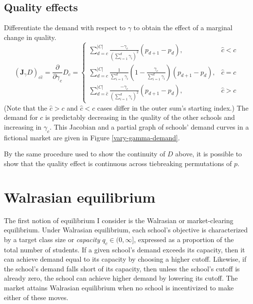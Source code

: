 \documentclass[12pt]{article}
\numberwithin{equation}{subsection}
\theoremstyle{definition}
\begin{document}
\subsection{Quality effects} \label{unconstrainedqualityeffects}
Differentiate the demand with respect to $\gamma$ to obtain the effect of a marginal change in quality.
\begin{equation} \label{jac-gamma-demand-uncons}
\left(\mathbf{J}_\gamma D \right)_{c\hat c} =
\frac{\partial}{\partial\gamma_{\hat c}} D_c = \begin{cases}
\sum_{d=c}^{|C|} \frac{-\gamma_c}{\left(\sum_{i=1}^{d} \gamma_i \right)^2} \left(p_{d+1} - p_d \right), & \hat c < c \\
\sum_{d=c}^{|C|} \frac{1}{\sum_{i=1}^{d} \gamma_i}
    \left( 1 - \frac{\gamma_c}{\sum_{i=1}^{d}\gamma_i }\right)
    \left(p_{d+1} - p_d \right), & \hat c = c\\
\sum_{d=\hat c}^{|C|} \frac{-\gamma_c}{\left(\sum_{i=1}^{d}\gamma_i \right)^2} \left(p_{d+1} - p_d \right), & \hat c > c
\end{cases}
\end{equation}
(Note that the $\hat c > c$ and $ \hat c < c$ cases differ in the outer sum's starting index.) The demand for $c$ is predictably decreasing in the quality of the other schools and increasing in $\gamma_c$. This Jacobian and a partial graph of schools’ demand curves in a fictional market are given in Figure \ref{vary-gamma-demand}. 

By the same procedure used to show the continuity of $D$ above, it is possible to show that the quality effect is continuous across tiebreaking permutations of $p$.




\section{Walrasian equilibrium}
The first notion of equilibrium I consider is the Walrasian or market-clearing equilibrium. Under Walrasian equilibrium, each school's objective is characterized by a target class size or \emph{capacity} $q_c \in (0, \infty]$, expressed as a proportion of the total number of students. If a given school's demand exceeds its capacity, then it can achieve demand equal to its capacity by choosing a higher cutoff. Likewise, if the school's demand falls short of its capacity, then unless the school's cutoff is already zero, the school can achieve higher demand by lowering its cutoff. The market attains Walrasian equilibrium when no school is incentivized to make either of these moves.
\end{document}
